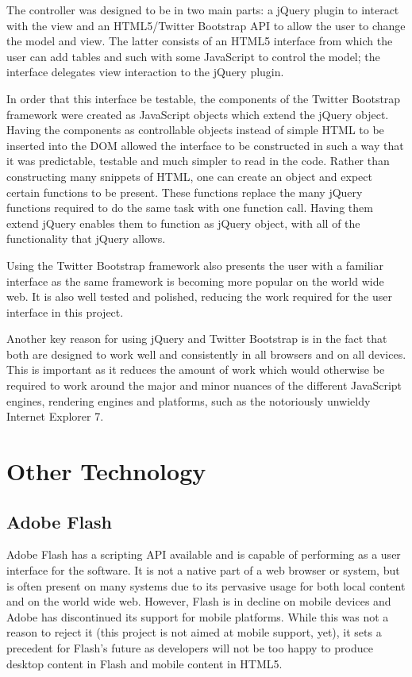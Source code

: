 The controller was designed to be in two main parts: a jQuery plugin to interact with the view and an HTML5\slash Twitter Bootstrap API to allow the user to change the model and view. The latter consists of an HTML5 interface from which the user can add tables and such with some Java\-Script to control the model; the interface delegates view interaction to the jQuery plugin.

In order that this interface be testable, the components of the Twitter Bootstrap framework were created as Java\-Script objects which extend the jQuery object. Having the components as controllable objects instead of simple HTML to be inserted into the DOM allowed the interface to be constructed in such a way that it was predictable, testable and much simpler to read in the code. Rather than constructing many snippets of HTML, one can create an object and expect certain functions to be present. These functions replace the many jQuery functions required to do the same task with one function call. Having them extend jQuery enables them to function as jQuery object, with all of the functionality that jQuery allows.

Using the Twitter Bootstrap framework also presents the user with a familiar interface as the same framework is becoming more popular on the world wide web. It is also well tested and polished, reducing the work required for the user interface in this project.

Another key reason for using jQuery and Twitter Bootstrap is in the fact that both are designed to work well and consistently in all browsers and on all devices. This is important as it reduces the amount of work which would otherwise be required to work around the major and minor nuances of the different Java\-Script engines, rendering engines and platforms, such as the notoriously unwieldy Internet Explorer 7.

\section{Other Technology}
\subsection{Adobe Flash}
Adobe Flash has a scripting API available and is capable of performing as a user interface for the software. It is not a native part of a web browser or system, but is often present on many systems due to its pervasive usage for both local content and on the world wide web. However, Flash is in decline on mobile devices and Adobe has discontinued its support for mobile platforms. While this was not a reason to reject it (this project is not aimed at mobile support, yet), it sets a precedent for Flash's future as developers will not be too happy to produce desktop content in Flash and mobile content in HTML5.

